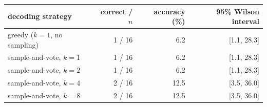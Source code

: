 \begin{tabular}{@{}lrrr@{}}
\toprule
decoding strategy & correct / $n$ & accuracy (\%) & 95\% Wilson interval \\
\midrule
greedy ($k=1$, no sampling) & 1 / 16 & 6.2 & [1.1, 28.3] \\
sample-and-vote, $k=1$ & 1 / 16 & 6.2 & [1.1, 28.3] \\
sample-and-vote, $k=2$ & 1 / 16 & 6.2 & [1.1, 28.3] \\
sample-and-vote, $k=4$ & 2 / 16 & 12.5 & [3.5, 36.0] \\
sample-and-vote, $k=8$ & 2 / 16 & 12.5 & [3.5, 36.0] \\
\bottomrule
\end{tabular}
